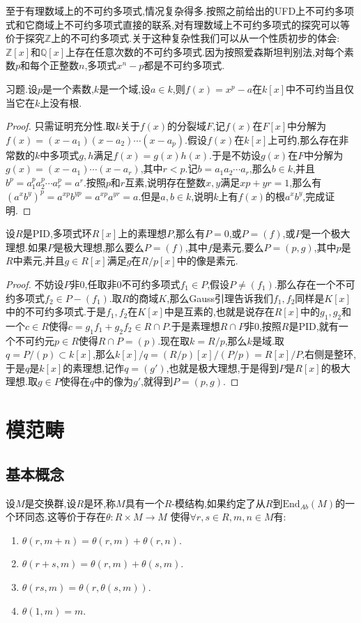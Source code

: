 至于有理数域上的不可约多项式,情况复杂得多.按照之前给出的UFD上不可约多项式和它商域上不可约多项式直接的联系,对有理数域上不可约多项式的探究可以等价于探究$\mathbb{Z}$上的不可约多项式.关于这种复杂性我们可以从一个性质初步的体会:$\mathbb{Z}[x]$和$\mathbb{Q}[x]$上存在任意次数的不可约多项式.因为按照爱森斯坦判别法,对每个素数$p$和每个正整数$n$,多项式$x^n-p$都是不可约多项式.

习题.设$p$是一个素数,$k$是一个域,设$a\in k$,则$f(x)=x^p-a$在$k[x]$中不可约当且仅当它在$k$上没有根.
\begin{proof}
	
	只需证明充分性.取$k$关于$f(x)$的分裂域$F$,记$f(x)$在$F[x]$中分解为$f(x)=(x-a_1)(x-a_2)\cdots(x-a_p)$.假设$f(x)$在$k[x]$上可约,那么存在非常数的$k$中多项式$g,h$满足$f(x)=g(x)h(x)$.于是不妨设$g(x)$在$F$中分解为$g(x)=(x-a_1)\cdots(x-a_r)$,其中$r<p$.记$b=a_1a_2\cdots a_r$,那么$b\in k$,并且$b^p=a_1^pa_2^p\cdots a_r^p=a^r$.按照$p$和$r$互素,说明存在整数$x,y$满足$xp+yr=1$,那么有$(a^xb^y)^p=a^{xp}b^{yp}=a^{xp}a^{yr}=a$.但是$a,b\in k$,说明$k$上有$f(x)$的根$a^xb^y$,完成证明.
\end{proof}

设$R$是PID,多项式环$R[x]$上的素理想$P$,那么有$P=0$,或$P=(f)$,或$P$是一个极大理想.如果$P$是极大理想,那么要么$P=(f)$,其中$f$是素元,要么$P=(p,g)$,其中$p$是$R$中素元,并且$g\in R[x]$满足$g$在$R/p[x]$中的像是素元.
\begin{proof}
	
	不妨设$P$非0,任取非0不可约多项式$f_1\in P$,假设$P\not=(f_1)$.那么存在一个不可约多项式$f_2\in P-(f_1)$.取$R$的商域$K$,那么Gauss引理告诉我们$f_1,f_2$同样是$K[x]$中的不可约多项式.于是$f_1,f_2$在$K[x]$中是互素的,也就是说存在$R[x]$中的$g_1,g_2$和一个$c\in R$使得$c=g_1f_1+g_2f_2\in R\cap P$.于是素理想$R\cap P$非0,按照$R$是PID,就有一个不可约元$p\in R$使得$R\cap P=(p)$.现在取$k=R/p$,那么$k$是域.取$q=P/(p)\subset k[x]$,那么$k[x]/q=(R/p)[x]/(P/p)=R[x]/P$,右侧是整环,于是$q$是$k[x]$的素理想,记作$q=(g')$,也就是极大理想,于是得到$P$是$R[x]$的极大理想.取$g\in P$使得在$q$中的像为$g'$,就得到$P=(p,g)$.
\end{proof}
\newpage
\section{模范畴}
\subsection{基本概念}

设$M$是交换群,设$R$是环,称$M$具有一个$R$-模结构,如果约定了从$R$到$\mathrm{End}_{Ab}(M)$的一个环同态.这等价于存在$\theta:R\times M\to M$ 使得$\forall r,s\in R,m,n\in M$有:
\begin{enumerate}
	\item $\theta(r,m+n)=\theta(r,m)+\theta(r,n)$.
	\item $\theta(r+s,m)=\theta(r,m)+\theta(s,m)$.
	\item $\theta(rs,m)=\theta(r,\theta(s,m))$.
	\item $\theta(1,m)=m$.
\end{enumerate}

